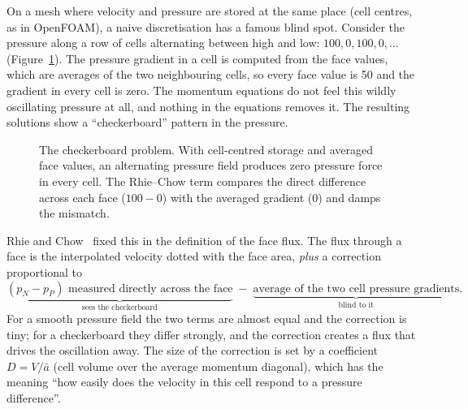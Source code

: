 \documentclass[11pt,a4paper]{article}
\begin{document}
On a mesh where velocity and pressure are stored at the same place (cell
centres, as in OpenFOAM), a naive discretisation has a famous blind spot.
Consider the pressure along a row of cells alternating between high and low:
$100, 0, 100, 0, \dots$ (Figure~\ref{fig:checker}). The pressure gradient
in a cell is computed from the face values, which are averages of the two
neighbouring cells, so every face value is 50 and the gradient in every
cell is zero. The momentum equations do not feel this wildly oscillating
pressure at all, and nothing in the equations removes it. The resulting
solutions show a ``checkerboard'' pattern in the pressure.

\begin{figure}[tbp]
\centering
{}
\caption{The checkerboard problem. With cell-centred storage and averaged
face values, an alternating pressure field produces zero pressure force in
every cell. The Rhie--Chow term compares the direct difference across each
face ($100-0$) with the averaged gradient ($0$) and damps the mismatch.}
\label{fig:checker}
\end{figure}

Rhie and Chow~\cite{RhieChow1983} fixed this in the definition of the face
flux. The flux through a face is the interpolated velocity dotted with the
face area, \emph{plus} a correction proportional to
\begin{equation*}
  \underbrace{(p_N-p_P)\text{ measured directly across the face}}_{\text{sees the checkerboard}}
  \;-\;
  \underbrace{\text{average of the two cell pressure gradients}}_{\text{blind to it}} .
\end{equation*}
For a smooth pressure field the two terms are almost equal and the
correction is tiny; for a checkerboard they differ strongly, and the
correction creates a flux that drives the oscillation away. The size of the
correction is set by a coefficient $D=V/\bar a$ (cell volume over the
average momentum diagonal), which has the meaning ``how easily does the
velocity in this cell respond to a pressure difference''.
\end{document}
